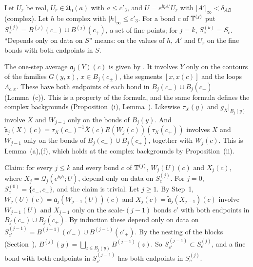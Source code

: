 \begin{detail}\label{d11a:F3}
Let $U_r$ be real, $U_r\in\mathfrak U_0(a)$ with $a\le c'_3$, and $U=e^{\ii\eta A'}U_r$ with $|A'|_\infty<\delta_{AB}$ (complex). Let $h$ be complex with $|h|_\infty\le c'_3$. For a bond $c$ of $\mathbb T^{(j)}$ put $S^{(j)}_c=B^{(j)}(c_-)\cup B^{(j)}(c_+)$, a set of fine points; for $j=k$, $S^{(k)}_c=S_c$. ``Depends only on data on $S$'' means: on the values of $h$, $A'$ and $U_r$ on the fine bonds with both endpoints in $S$.
\begin{step}
The one-step average $\mathfrak a_j(Y)(c)$ is given by . It involves $Y$ only on the contours of the families $G(y,x)$, $x\in B_j(c_\pm)$, the segments $[x,x(c)]$ and the loops $\Lambda_{c,x}$. These have both endpoints of each bond in $B_j(c_-)\cup B_j(c_+)$ (Lemma~(c)). This is a property of the formula, and the same formula defines the complex backgrounds (Proposition~(i), Lemma~). Likewise $\tau_X(y)$ and $g_X|_{B_j(y)}$ involve $X$ and $W_{j-1}$ only on the bonds of $B_j(y)$. And $\tilde{\mathfrak a}_j(X)(c)=\tau_X(c_-)^{-1}\overline X(c)R(W_j(c))(\tau_X(c_+))$ involves $X$ and $W_{j-1}$ only on the bonds of $B_j(c_-)\cup B_j(c_+)$, together with $W_j(c)$. This is Lemma~(a),(f), which holds at the complex backgrounds by Proposition~(ii).
\end{step}
\begin{step}
Claim: for every $j\le k$ and every bond $c$ of $\mathbb T^{(j)}$, $W_j(U)(c)$ and $X_j(c)$, where $X_j=\mathcal Q_j(e^{\ii\eta h};U)$, depend only on data on $S^{(j)}_c$. For $j=0$, $S^{(0)}_c=\{c_-,c_+\}$, and the claim is trivial. Let $j\ge1$. By Step~1, $W_j(U)(c)=\mathfrak a_j(W_{j-1}(U))(c)$ and $X_j(c)=\tilde{\mathfrak a}_j(X_{j-1})(c)$ involve $W_{j-1}(U)$ and $X_{j-1}$ only on the scale-$(j-1)$ bonds $c'$ with both endpoints in $B_j(c_-)\cup B_j(c_+)$. By induction these depend only on data on $S^{(j-1)}_{c'}=B^{(j-1)}(c'_-)\cup B^{(j-1)}(c'_+)$. By the nesting of the blocks (Section~), $B^{(j)}(y)=\bigsqcup_{z\in B_j(y)}B^{(j-1)}(z)$. So $S^{(j-1)}_{c'}\subset S^{(j)}_c$, and a fine bond with both endpoints in $S^{(j-1)}_{c'}$ has both endpoints in $S^{(j)}_c$.
\end{step}
\begin{step}[Consequences]

\end{step}
\end{detail}
